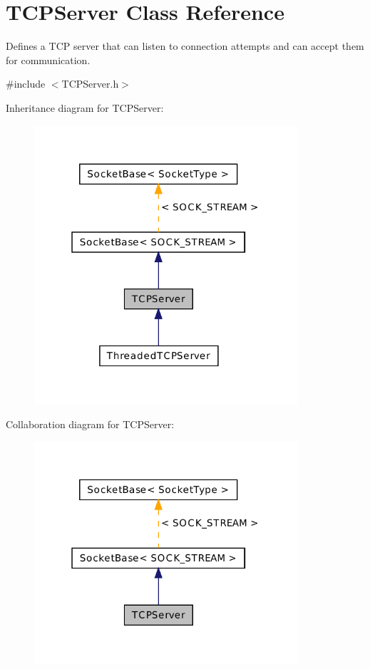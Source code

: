 \hypertarget{class_t_c_p_server}{\section{T\-C\-P\-Server Class Reference}
\label{class_t_c_p_server}
}


Defines a T\-C\-P server that can listen to connection attempts and can accept them for communication.  




{\ttfamily \#include $<$T\-C\-P\-Server.\-h$>$}



Inheritance diagram for T\-C\-P\-Server\-:\nopagebreak
\begin{figure}[H]
\begin{center}
\leavevmode
\includegraphics[width=277pt]{class_t_c_p_server__inherit__graph}
\end{center}
\end{figure}


Collaboration diagram for T\-C\-P\-Server\-:\nopagebreak
\begin{figure}[H]
\begin{center}
\leavevmode
\includegraphics[width=277pt]{class_t_c_p_server__coll__graph}
\end{center}
\end{figure}
